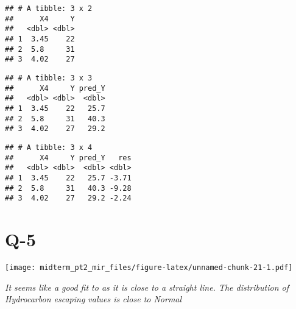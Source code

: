 \documentclass[
]{article}
\newenvironment{Shaded}{\begin{snugshade}}{\end{snugshade}}
\newcommand{\AttributeTok}[1]{\textcolor[rgb]{0.77,0.63,0.00}{#1}}
\newcommand{\ConstantTok}[1]{\textcolor[rgb]{0.00,0.00,0.00}{#1}}
\newcommand{\DecValTok}[1]{\textcolor[rgb]{0.00,0.00,0.81}{#1}}
\newcommand{\FunctionTok}[1]{\textcolor[rgb]{0.00,0.00,0.00}{#1}}
\newcommand{\NormalTok}[1]{#1}
\newcommand{\OtherTok}[1]{\textcolor[rgb]{0.56,0.35,0.01}{#1}}
\newcommand{\SpecialCharTok}[1]{\textcolor[rgb]{0.00,0.00,0.00}{#1}}
\newcommand{\StringTok}[1]{\textcolor[rgb]{0.31,0.60,0.02}{#1}}
\begin{document}
\begin{verbatim}
## # A tibble: 3 x 2
##      X4     Y
##   <dbl> <dbl>
## 1  3.45    22
## 2  5.8     31
## 3  4.02    27
\end{verbatim}

\begin{Shaded}
\end{Shaded}

\begin{verbatim}
## # A tibble: 3 x 3
##      X4     Y pred_Y
##   <dbl> <dbl>  <dbl>
## 1  3.45    22   25.7
## 2  5.8     31   40.3
## 3  4.02    27   29.2
\end{verbatim}

\begin{Shaded}
\end{Shaded}

\begin{verbatim}
## # A tibble: 3 x 4
##      X4     Y pred_Y   res
##   <dbl> <dbl>  <dbl> <dbl>
## 1  3.45    22   25.7 -3.71
## 2  5.8     31   40.3 -9.28
## 3  4.02    27   29.2 -2.24
\end{verbatim}

\hypertarget{q-5}{%
\section{Q-5}\label{q-5}}

\begin{Shaded}
\end{Shaded}

\texttt{[image: midterm\_pt2\_mir\_files/figure-latex/unnamed-chunk-21-1.pdf]}

\emph{It seems like a good fit to as it is close to a straight line. The
distribution of Hydrocarbon escaping values is close to Normal}
\end{document}
